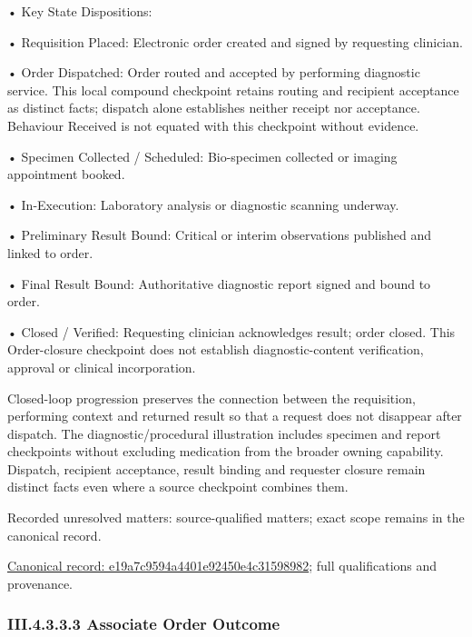 •
Key State Dispositions:



•
Requisition Placed: Electronic order created and signed by requesting clinician.



•
Order Dispatched: Order routed and accepted by performing diagnostic service. This local compound checkpoint retains routing and recipient acceptance as distinct facts; dispatch alone establishes neither receipt nor acceptance. Behaviour Received is not equated with this checkpoint without evidence.



•
Specimen Collected / Scheduled: Bio-specimen collected or imaging appointment booked.



•
In-Execution: Laboratory analysis or diagnostic scanning underway.



•
Preliminary Result Bound: Critical or interim observations published and linked to order.



•
Final Result Bound: Authoritative diagnostic report signed and bound to order.



•
Closed / Verified: Requesting clinician acknowledges result; order closed. This Order-closure checkpoint does not establish diagnostic-content verification, approval or clinical incorporation.



Closed-loop progression preserves the connection between the requisition, performing context and returned result so that a request does not disappear after dispatch. The diagnostic/procedural illustration includes specimen and report checkpoints without excluding medication from the broader owning capability. Dispatch, recipient acceptance, result binding and requester closure remain distinct facts even where a source checkpoint combines them.


{\small Recorded unresolved matters: source-qualified matters; exact scope remains in the canonical record.}\par
{\footnotesize \href{../../../../../../../../continuum/business/business-process/e19a7c9594a4401e92450e4c31598982.md}{Canonical record: e19a7c9594a4401e92450e4c31598982}; full qualifications and provenance.}\par
\subsubsection*{III.4.3.3.3 Associate Order Outcome}
\label{navigation:III.4.3.3.3}

